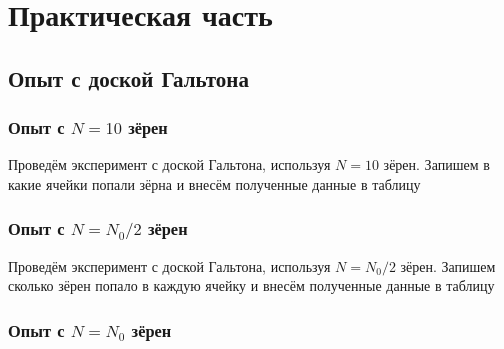 \section{Практическая часть}
\subsection{Опыт с доской Гальтона}

\subsubsection{Опыт с $N = 10$ зёрен}

Проведём эксперимент с доской Гальтона, используя $N = 10$ зёрен. Запишем в какие ячейки попали зёрна и внесём полученные данные в таблицу

\subsubsection{Опыт с $N = N_0 / 2$ зёрен}

Проведём эксперимент с доской Гальтона, используя $N = N_0 / 2$ зёрен. Запишем сколько зёрен попало в каждую ячейку и внесём полученные данные в таблицу


\subsubsection{Опыт с $N = N_0$ зёрен} 